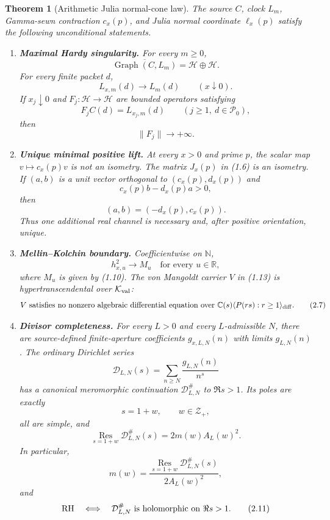 \documentclass[11pt]{article}
\newtheorem{theorem}{Theorem}[section]
\theoremstyle{definition}
\theoremstyle{remark}
\newcommand{\C}{\mathbb C}
\newcommand{\R}{\mathbb R}
\newcommand{\N}{\mathbb N}
\newcommand{\cD}{\mathcal D}
\newcommand{\cH}{\mathcal H}
\newcommand{\cK}{\mathcal K}
\newcommand{\cP}{\mathcal P}
\newcommand{\cZ}{\mathcal Z}
\newcommand{\Res}{\operatorname*{Res}}
\newcommand{\Graph}{\operatorname{Graph}}
\begin{document}
\begin{theorem}[Arithmetic Julia normal-cone law]\label{thm:normal-cone}
The source \(C\), clock \(L_m\), Gamma-sewn contraction \(c_x(p)\), and Julia normal coordinate
\(\ell_x(p)\) satisfy the following unconditional statements.

\begin{enumerate}[label=\textup{(\Alph*)}]
\item \textbf{Maximal Hardy singularity.}  For every \(m\ge0\),
\[
 \overline{\Graph(C,L_m)}=\cH\oplus\cH.              \tag{2.2}
\]
For every finite packet \(d\),
\[
 L_{x,m}(d)\longrightarrow L_m(d)\qquad(x\downarrow0). \tag{2.3}
\]
If \(x_j\downarrow0\) and \(F_j:\cH\to\cH\) are bounded operators satisfying
\[
 F_jC(d)=L_{x_j,m}(d)\qquad(j\ge1,\ d\in\cP_0),
\]
then
\[
 \|F_j\|\longrightarrow+\infty.                     \tag{2.4}
\]

\item \textbf{Unique minimal positive lift.}  At every \(x>0\) and prime \(p\), the scalar
map \(v\mapsto c_x(p)v\) is not an isometry.  The matrix \(J_x(p)\) in (1.6) is an isometry.
If \((a,b)\) is a unit vector orthogonal to \((c_x(p),d_x(p))\) and
\[
 c_x(p)b-d_x(p)a>0,
\]
then
\[
 (a,b)=(-d_x(p),c_x(p)).                             \tag{2.5}
\]
Thus one additional real channel is necessary and, after positive orientation, unique.

\item \textbf{Mellin--Kolchin boundary.}  Coefficientwise on \(\N\),
\[
 h_{x,u}^2\longrightarrow M_u
 \quad\text{for every }u\in\R,                      \tag{2.6}
\]
where \(M_u\) is given by (1.10).  The von Mangoldt carrier \(V\) in (1.13) is
hypertranscendental over \(\cK_{\rm val}\):
\[
 V\text{ satisfies no nonzero algebraic differential equation over }
 \C(s)\langle P(rs):r\ge1\rangle_{\rm diff}.         \tag{2.7}
\]

\item \textbf{Divisor completeness.}  For every \(L>0\) and every \(L\)-admissible \(N\),
there are source-defined finite-aperture coefficients \(g_{x,L,N}(n)\) with limits
\(g_{L,N}(n)\).  The ordinary Dirichlet series
\[
 \cD_{L,N}(s)=\sum_{n\ge N}\frac{g_{L,N}(n)}{n^s}
\]
has a canonical meromorphic continuation \(\cD_{L,N}^{\#}\) to \(\Re s>1\).  Its poles are
exactly
\[
 s=1+w,\qquad w\in\cZ_+,                            \tag{2.8}
\]
all are simple, and
\[
 \Res_{s=1+w}\cD_{L,N}^{\#}(s)=2m(w)A_L(w)^2.        \tag{2.9}
\]
In particular,
\[
 m(w)=\frac{\Res_{s=1+w}\cD_{L,N}^{\#}(s)}
 {2A_L(w)^2},                                       \tag{2.10}
\]
and
\[
 {\rm RH}\quad\Longleftrightarrow\quad
 \cD_{L,N}^{\#}\text{ is holomorphic on }\Re s>1.   \tag{2.11}
\]


\end{enumerate}
\end{theorem}
\end{document}
